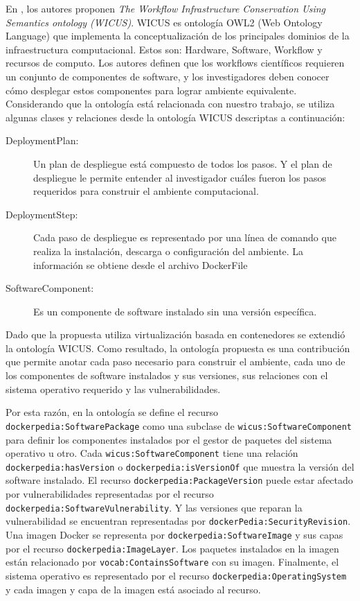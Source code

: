 En \cite{santana2017reproducibility}, los autores proponen \emph{The Workflow Infrastructure Conservation Using Semantics ontology (WICUS)}. WICUS es ontología OWL2 (Web Ontology Language) que implementa la conceptualización de los principales dominios de la infraestructura computacional. Estos son: Hardware, Software, Workflow y recursos de computo.
Los autores definen que los workflows científicos requieren un conjunto de componentes de software, y los investigadores deben conocer cómo desplegar estos componentes para lograr ambiente equivalente.
Considerando que la ontología está relacionada con nuestro trabajo, se utiliza algunas clases y relaciones desde la ontología WICUS descriptas a continuación:

\begin{description}
	\item [DeploymentPlan:]  Un plan de despliegue está compuesto de todos los pasos. Y el plan de despliegue le permite entender al investigador cuáles fueron los pasos requeridos para construir el ambiente computacional.
	\item [DeploymentStep:] Cada paso de despliegue es representado por una línea de comando que realiza la instalación, descarga o configuración del ambiente. La información se obtiene desde el archivo DockerFile
	\item [SoftwareComponent:] Es un componente de software instalado sin una versión específica. 
\end{description} 

Dado que la propuesta utiliza virtualización basada en contenedores se extendió la ontología WICUS. Como resultado,  la ontología propuesta es una contribución que permite anotar cada paso necesario para construir el ambiente, cada uno de los componentes de software instalados y sus versiones, sus relaciones con el sistema operativo requerido y las vulnerabilidades.

Por esta razón, en la ontología se define el recurso \texttt{dockerpedia:SoftwarePackage} como una subclase de \texttt{wicus:SoftwareComponent} para definir los componentes instalados por el gestor de paquetes del sistema operativo u otro.
Cada \texttt{wicus:SoftwareComponent} tiene una relación \texttt{dockerpedia:hasVersion} o \texttt{dockerpedia:isVersionOf} que muestra la versión del software instalado.
El recurso \texttt{dockerpedia:PackageVersion} puede estar afectado por vulnerabilidades representadas por el recurso \texttt{dockerpedia:SoftwareVulnerability}. Y las versiones que reparan la vulnerabilidad se encuentran representadas por \texttt{dockerPedia:SecurityRevision}.
Una imagen Docker se representa por \texttt{dockerpedia:SoftwareImage} y sus capas por el recurso \texttt{dockerpedia:ImageLayer}. Los paquetes instalados en la imagen están relacionado por \texttt{vocab:ContainsSoftware} con su imagen.
Finalmente, el sistema operativo es representado por el recurso \texttt{dockerpedia:OperatingSystem} y cada imagen y capa de la imagen está asociado al recurso.



